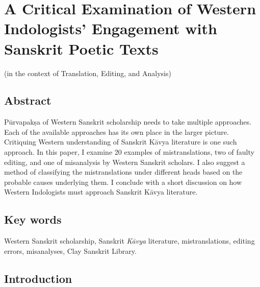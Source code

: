\chapter[A Critical Examination of Western Indologists’...]{A Critical Examination of Western Indologists’ Engagement with Sanskrit Poetic Texts}\label{chapter\thechapter:begin}

\begin{center}
(in the context of Translation, Editing, and Analysis)
\end{center}


\section*{Abstract} 

Pūrvapakṣa of Western Sanskrit scholarship needs to take multiple approaches. Each of the available approaches has its own place in the larger picture. Critiquing Western understanding of Sanskrit Kāvya literature is one such approach. In this paper, I examine 20 examples of mistranslations, two of faulty editing, and one of misanalysis by Western Sanskrit scholars. I also suggest a method of classifying the mistranslations under different heads based on the probable causes underlying them. I conclude with a short discussion on how Western Indologists must approach Sanskrit Kāvya literature. 

\section*{Key words} 

Western Sanskrit scholarship, Sanskrit \textsl{Kāvya} literature, mistranslations, editing errors, misanalyses, Clay Sanskrit Library. 


\section*{Introduction}  


